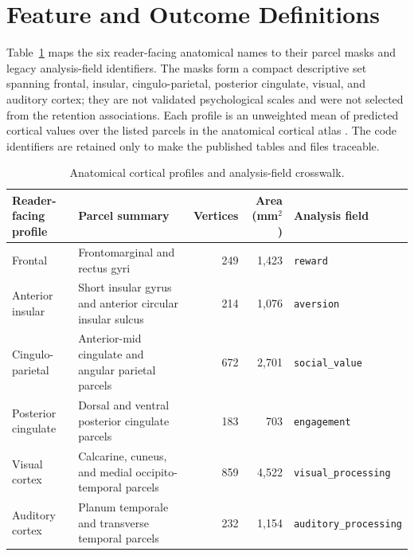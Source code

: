 \appendices

\section{Feature and Outcome Definitions}
\label{app:definitions}

\mbox{Table~\ref{tab:profiles}} maps the six reader-facing anatomical names to their parcel masks and legacy analysis-field identifiers. The masks form a compact descriptive set spanning frontal, insular, cingulo-parietal, posterior cingulate, visual, and auditory cortex; they are not validated psychological scales and were not selected from the retention associations.  Each profile is an unweighted mean of predicted cortical values over the listed parcels in the anatomical cortical atlas \cite{destrieux2010parcellation}. The code identifiers are retained only to make the published tables and files traceable.

\begin{table}[!t]
\caption{Anatomical cortical profiles and analysis-field crosswalk.}
\label{tab:profiles}
\centering
\renewcommand{\arraystretch}{1.1}
\tablebodyfont
\begin{tabularx}{\textwidth}{@{}lXrrl@{}}
\toprule
Reader-facing profile & Parcel summary & Vertices & Area (mm$^2$) & Analysis field \\
\midrule
Frontal & Frontomarginal and rectus gyri & 249 & 1,423 & \texttt{reward} \\
Anterior insular & Short insular gyrus and anterior circular insular sulcus & 214 & 1,076 & \texttt{aversion} \\
Cingulo-parietal & Anterior-mid cingulate and angular parietal parcels & 672 & 2,701 & \texttt{social\_value} \\
Posterior cingulate & Dorsal and ventral posterior cingulate parcels & 183 & 703 & \texttt{engagement} \\
Visual cortex & Calcarine, cuneus, and medial occipito-temporal parcels & 859 & 4,522 & \texttt{visual\_processing} \\
Auditory cortex & Planum temporale and transverse temporal parcels & 232 & 1,154 & \texttt{auditory\_processing} \\
\bottomrule
\end{tabularx}
\end{table}

